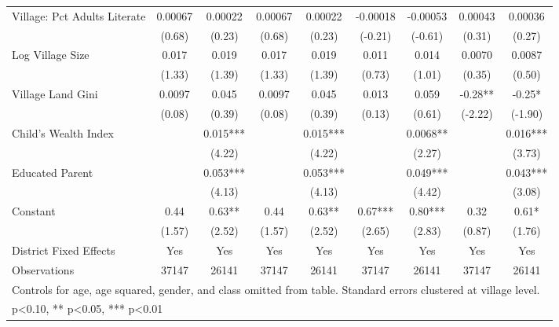 \begin{sidewaystable}[htbp]
\begin{tabular}{l*{8}{c}}
Village: Pct Adults Literate&  0.00067   &  0.00022   &  0.00067   &  0.00022   & -0.00018   & -0.00053   &  0.00043   &  0.00036   \\
                &   (0.68)   &   (0.23)   &   (0.68)   &   (0.23)   &  (-0.21)   &  (-0.61)   &   (0.31)   &   (0.27)   \\
Log Village Size&    0.017   &    0.019   &    0.017   &    0.019   &    0.011   &    0.014   &   0.0070   &   0.0087   \\
                &   (1.33)   &   (1.39)   &   (1.33)   &   (1.39)   &   (0.73)   &   (1.01)   &   (0.35)   &   (0.50)   \\
Village Land Gini&   0.0097   &    0.045   &   0.0097   &    0.045   &    0.013   &    0.059   &    -0.28** &    -0.25*  \\
                &   (0.08)   &   (0.39)   &   (0.08)   &   (0.39)   &   (0.13)   &   (0.61)   &  (-2.22)   &  (-1.90)   \\
Child's Wealth Index&            &    0.015***&            &    0.015***&            &   0.0068** &            &    0.016***\\
                &            &   (4.22)   &            &   (4.22)   &            &   (2.27)   &            &   (3.73)   \\
Educated Parent &            &    0.053***&            &    0.053***&            &    0.049***&            &    0.043***\\
                &            &   (4.13)   &            &   (4.13)   &            &   (4.42)   &            &   (3.08)   \\
Constant        &     0.44   &     0.63** &     0.44   &     0.63** &     0.67***&     0.80***&     0.32   &     0.61*  \\
                &   (1.57)   &   (2.52)   &   (1.57)   &   (2.52)   &   (2.65)   &   (2.83)   &   (0.87)   &   (1.76)   \\
District Fixed Effects&      Yes   &      Yes   &      Yes   &      Yes   &      Yes   &      Yes   &      Yes   &      Yes   \\
\midrule
Observations    &    37147   &    26141   &    37147   &    26141   &    37147   &    26141   &    37147   &    26141   \\
\bottomrule
\multicolumn{9}{l}{\footnotesize Controls for age, age squared, gender, and class omitted from table. Standard errors clustered at village level.}\\
\multicolumn{9}{l}{\footnotesize * p<0.10, ** p<0.05, *** p<0.01}\\
\end{tabular}
\end{sidewaystable}
